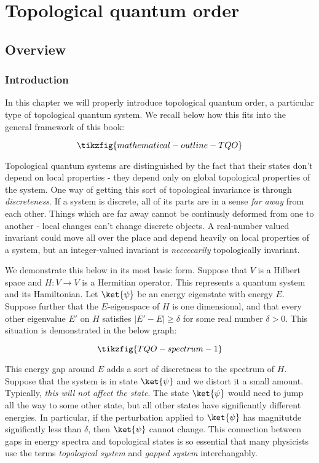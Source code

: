\section{Topological quantum order}
\label{Topological quantum order}

\subsection{Overview}

\subsubsection{Introduction}

In this chapter we will properly introduce topological quantum order, a particular type of topological quantum system. We recall below how this fits into the general framework of this book:

\begin{equation*}
\tikzfig{mathematical-outline-TQO}
\end{equation*}

Topological quantum systems are distinguished by the fact that their states don't depend on local properties - they depend only on global topological properties of the system. One way of getting this sort of topological invariance is through \textit{discreteness}. If a system is discrete, all of its parts are in a sense \textit{far away} from each other. Things which are far away cannot be continusly deformed from one to another - local changes can't change discrete objects. A real-number valued invariant could move all over the place and depend heavily on local properties of a system, but an integer-valued invariant is \textit{neccecarily} topologically invariant.

We demonstrate this below in its most basic form. Suppose that $V$ is a Hilbert space and $H:V\to V$ is a Hermitian operator. This represents a quantum system and its Hamiltonian. Let $\ket{\psi}$ be an energy eigenstate with energy $E$. Suppose further that the $E$-eigenspace of $H$ is one dimensional, and that every other eigenvalue $E'$ on $H$ satisfies $|E'-E|\geq \delta$ for some real number $\delta>0$. This situation is demonstrated in the below graph:

\begin{equation*}
\tikzfig{TQO-spectrum-1}
\end{equation*}

This energy gap around $E$ adds a sort of discretness to the spectrum of $H$. Suppose that the system is in state $\ket{\psi}$ and we distort it a small amount. Typically, \textit{this will not affect the state}. The state $\ket{\psi}$ would need to jump all the way to some other state, but all other states have significantly different energies. In particular, if the perturbation applied to $\ket{\psi}$ has magnitutde significatly less than $\delta$, then $\ket{\psi}$ cannot change. This connection between gaps in energy spectra and topological states is so essential that many physicists use the terms \textit{topological system} and \textit{gapped system} interchangably. 

